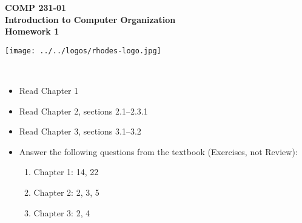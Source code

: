 \documentclass[10pt]{article}
\begin{document}

\hspace{-5mm}
\begin{minipage}{0.65\linewidth}
  \textbf{
      \hspace{-3mm}
      {\Large COMP 231-01}\\
      {\Large Introduction to Computer Organization}\\
      {\Large Homework 1}}
\end{minipage}
\begin{minipage}{0.35\linewidth}
  \texttt{[image: ../../logos/rhodes-logo.jpg]}
\end{minipage}

\\


\begin{itemize}

\setlength\itemsep{10mm}

\item Read Chapter 1
\item Read Chapter 2, sections 2.1--2.3.1
\item Read Chapter 3, sections 3.1--3.2

\item Answer the following questions from the textbook (Exercises, not
  Review):


\begin{enumerate}
\setlength\itemsep{5mm}
\item Chapter 1: 14, 22
\item Chapter 2: 2, 3, 5
\item Chapter 3: 2, 4
\end{enumerate}

\end{itemize}
\end{document}
